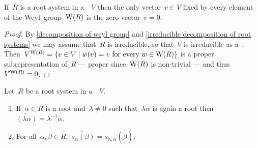 \begin{corollary}
  \label{weyl group fixes no vector}
  If~$R$ is a root system in a~{\vectorspace{$\kf$}}~$V$ then the only vector~$v \in V$ fixed by every element of the Weyl~group~$\operatorname{W}(R)$ is the zero vector~$v = 0$.
\end{corollary}


\begin{proof}
  By \cref{decomposition of weyl group} and \cref{irreducible decomposition of root systems} we may assume that~$R$ is irreducible, so that~$V$ is irreducible as a~{}.
  Then~$V^{\Weyl(R)} = \{v \in V \suchthat \text{$w(v) = v$ for every~$w \in \Weyl(R)$}\}$ is a proper subrepresentation of~$R$ --- proper since~$\operatorname{W}(R)$ is non-trivial --- and thus~$V^{\operatorname{W}(R)} = 0$.
\end{proof}


\begin{lemma}
  \label{properties of coroots}
  Let~$R$ be a root system in a~{\vectorspace{$\kf$}}~$V$.
  \begin{enumerate}
    \item
      If~$\alpha \in R$ is a root and~$\lambda \neq 0$ such that~$\lambda \alpha$ is again a root then~$\check{(\lambda \alpha)} = \lambda^{-1} \check{\alpha}$.
    \item
      For all~$\alpha, \beta \in R$,~$\check{s_\alpha(\beta)} = s_{\check{\alpha}, \alpha}(\check{\beta})$.
  \end{enumerate}
\end{lemma}


